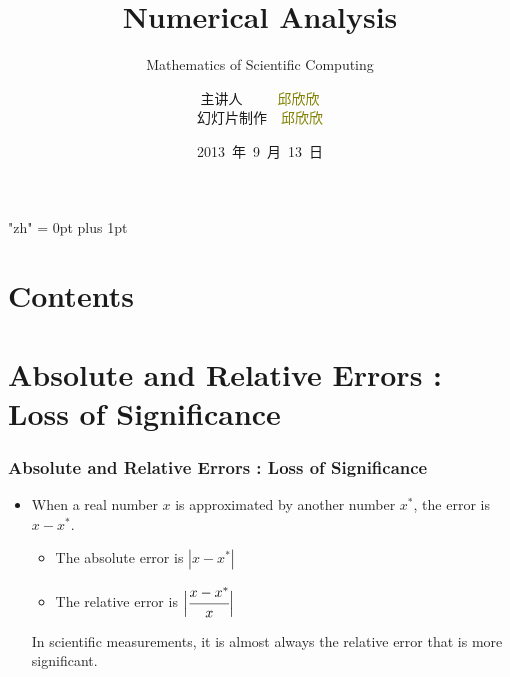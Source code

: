 \documentclass[notheorems,mathserif,table,compress]{beamer}  %
\begin{document}
\XeTeXlinebreaklocale "zh"         %
\XeTeXlinebreakskip = 0pt plus 1pt %


\title[Numerical Analysis]{Numerical Analysis}
\subtitle{Mathematics of Scientific Computing}
\author[qiu]{主讲人~~~~~\textcolor{olive}{邱欣欣}\\
    \quad 幻灯片制作~~\textcolor{olive}{邱欣欣}}
\institute[中国海洋大学]{\small\textcolor{violet}{中国海洋大学~~信息科学与工程学院}}
\date{2013~年~9~月~13~日}
\frame{ \titlepage }
\section*{Contents}
\section{Absolute and Relative Errors : Loss of Significance}

\begin{frame}
\frametitle{Absolute and Relative Errors : Loss of Significance}
\begin{itemize}
\item When a real number $x$ is approximated by another number $x^*$, the error is $x−x^*$.
\begin{itemize}
\item The absolute error is $|x-x^*|$ \newline
\item The relative error is $\Big|\cfrac{x-x^*}{x}\Big|$ \newline
\end{itemize}
In scientific measurements, it is almost always the relative error that is more significant.
\end{itemize}
\end{frame}
\end{document}
